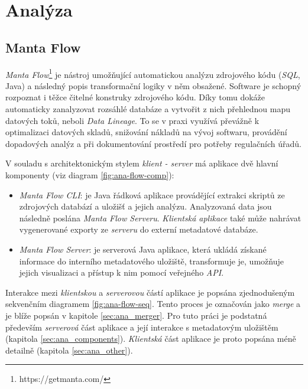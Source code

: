 \chapter{Analýza}
\section{Manta Flow}
\textit{Manta Flow}\footnote{https://getmanta.com/} je nástroj umožňující automatickou analýzu zdrojového kódu (\textit{SQL}, Java) a následný popis transformační logiky v něm obsažené. Software je schopný rozpoznat i těžce čitelné konstruky zdrojového kódu. Díky tomu dokáže automaticky zanalyzovat rozsáhlé databáze a vytvořit z nich přehlednou mapu datových toků, neboli \textit{Data Lineage}. To se v praxi využívá převážně k optimalizaci datových skladů, snižování nákladů na vývoj softwaru, provádění dopadových analýz a při dokumentování prostředí pro potřeby regulačních úřadů.

V souladu s architektonickým stylem \textit{klient - server} má aplikace dvě hlavní komponenty (viz diagram \ref{fig:ana-flow-comp}):
\begin{itemize}
	\item{\textit{Manta Flow CLI}}: je Java řádková aplikace provádějící extrakci skriptů ze zdrojových databází a uložišť a jejich analýzu. Analyzovaná data jsou následně poslána \textit{Manta Flow Serveru}. \textit{Klientská aplikace} také může nahrávat vygenerované exporty ze \textit{serveru} do externí metadatové databáze.
	\item{\textit{Manta Flow Server}}: je serverová Java aplikace, která ukládá získané informace do interního metadatového uložiště, transformuje je, umožňuje jejich visualizaci a přístup k nim pomocí veřejného \textit{API}.
\end{itemize}

Interakce mezi \textit{klientskou} a \textit{serverovou} částí aplikace je popsána zjednodušeným sekvenčním diagramem \ref{fig:ana-flow-seq}. Tento proces je označován jako \textit{merge} a je blíže popsán v kapitole \ref{sec:ana_merger}.
Pro tuto práci je podstatná především \textit{serverová} část aplikace a její interakce s metadatovým uložištěm (kapitola \ref{sec:ana_components}). \textit{Klientská} část aplikace je proto popsána méně detailně (kapitola \ref{sec:ana_other}).


